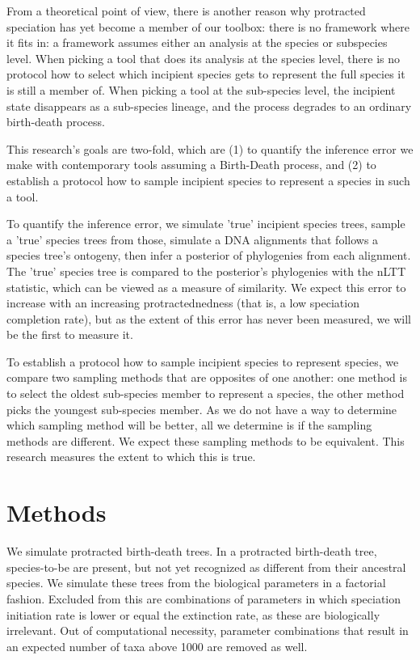 \documentclass{article}
\begin{document}
From a theoretical point of view, there is another reason why protracted
speciation has yet become a member of our toolbox: there is no framework
where it fits in: a framework assumes either an analysis at the species or
subspecies level. When picking a tool that does its analysis at the
species level, there is no protocol how to select which incipient species
gets to represent the full species it is still a member of. When picking
a tool at the sub-species level, the incipient state disappears as a
sub-species lineage, and the process degrades to an ordinary birth-death 
process.

This research's goals are two-fold, which are (1) to quantify the
inference error we make with contemporary tools assuming a Birth-Death
process, and (2) to establish a protocol how to sample incipient species
to represent a species in such a tool.

To quantify the inference error, we simulate 'true' incipient species
trees, sample a 'true' species trees from those, simulate a DNA alignments 
that follows a species tree's ontogeny, then infer a posterior of
phylogenies from each alignment. The 'true' species tree is compared to
the posterior's phylogenies with the nLTT statistic, which can be viewed
as a measure of similarity. We expect this error to increase with an
increasing protractednedness (that is, a low speciation completion rate),
but as the extent of this error has never been measured, we will be the
first to measure it.

To establish a protocol how to sample incipient species to represent species,
we compare two sampling methods that are opposites of one another: one
method is to select the oldest sub-species member to represent a species,
the other method picks the youngest sub-species member. As we do not have
a way to determine which sampling method will be better, all we determine
is if the sampling methods are different. We expect these
sampling methods to be equivalent. This research measures the extent to
which this is true.

\section{Methods}

We simulate protracted birth-death trees. In a protracted birth-death tree,
species-to-be are present, but not yet recognized as different from
their ancestral species. We simulate these trees from the biological parameters 
in a factorial fashion. Excluded from this are combinations of parameters in which
speciation initiation rate is lower or equal the extinction rate, as these
are biologically irrelevant. Out of computational necessity, 
parameter combinations that result in an expected number of taxa above 1000 
are removed as well.
\end{document}
